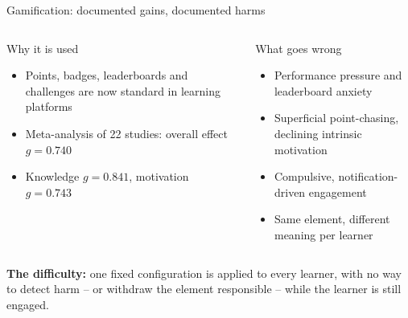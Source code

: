 \documentclass[10pt]{beamer}
\begin{document}
\begin{frame}{Gamification: documented gains, documented harms}
\begin{columns}[T]
    \begin{block}{Why it is used}
        \begin{itemize}
            \item Points, badges, leaderboards and challenges are now standard in learning platforms
            \item Meta-analysis of 22 studies: overall effect $g = 0.740$
            \item Knowledge $g = 0.841$, motivation $g = 0.743$ \cite{lu2024ai}
        \end{itemize}
    \end{block}
    \begin{alertblock}{What goes wrong}
        \begin{itemize}
            \item Performance pressure and leaderboard anxiety \cite{nugroho2025negative,edwards2022anxiety}
            \item Superficial point-chasing, declining intrinsic motivation
            \item Compulsive, notification-driven engagement \cite{gul2026brainrot}
            \item Same element, different meaning per learner \cite{gao2024sdt}
        \end{itemize}
    \end{alertblock}
\end{columns}
\vspace{0.3cm}
\begin{keybox}
\textbf{The difficulty:} one fixed configuration is applied to every learner, with no way to
detect harm -- or withdraw the element responsible -- while the learner is still engaged.
\end{keybox}
\end{frame}
\end{document}
